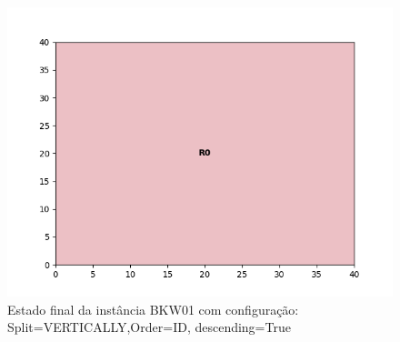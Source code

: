 \begin{figure}[H]
    \centering
    \caption[]{Estado final da instância BKW01 com configuração: Split=VERTICALLY,Order=ID, descending=True}
    \label{fig:bkw01-vertically-id-true}
    \includegraphics[scale=0.5]{output/figures/bkw/bkw01/vertically/id/true/00}
\end{figure}